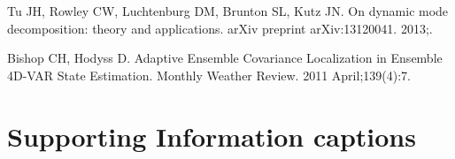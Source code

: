 \documentclass[10pt,letterpaper]{article}
\begin{document}
\begin{thebibliography}{10}
Tu JH, Rowley CW, Luchtenburg DM, Brunton SL, Kutz JN.
\newblock On dynamic mode decomposition: theory and applications.
\newblock arXiv preprint arXiv:13120041. 2013;.

Bishop CH, Hodyss D.
\newblock Adaptive Ensemble Covariance Localization in Ensemble 4D-VAR State
  Estimation.
\newblock Monthly Weather Review. 2011 April;139(4):7.









\end{thebibliography}

\clearpage
\pagebreak

\section*{Supporting Information captions}
\end{document}
